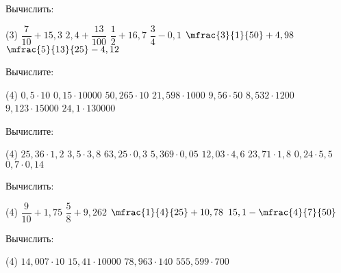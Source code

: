 %
%

\begin{class}[number=1]
	\begin{listofex}
		\item Вычислить:
		\begin{tasks}(3)
			\task \( \dfrac{7}{10}+15,3 \)
			\task \( 2,4+\dfrac{13}{100} \)
			\task \( \dfrac{1}{2}+16,7 \)
			\task \( \dfrac{3}{4}-0,1 \)
			\task \( \mfrac{3}{1}{50}+4,98 \)
			\task \( \mfrac{5}{13}{25}-4,12 \)
		\end{tasks}
		\item Вычислите:
		\begin{tasks}(4)
			\task \( 0,5\cdot10 \)
			\task \( 0,15\cdot10000 \)
			\task \( 50,265\cdot10 \)
			\task \( 21,598\cdot1000 \)
			\task \( 9,56\cdot50 \)
			\task \( 8,532\cdot1200 \)
			\task \( 9,123\cdot15000 \)
			\task \( 24,1\cdot130000 \)
		\end{tasks}
		\item Вычислите:
		\begin{tasks}(4)
			\task \( 25,36\cdot1,2 \)
			\task \( 3,5\cdot3,8 \)
			\task \( 63,25\cdot0,3 \)
			\task \( 5,369\cdot0,05 \)
			\task \( 12,03\cdot4,6 \)
			\task \( 23,71\cdot1,8 \)
			\task \( 0,24\cdot5,5 \)
			\task \( 0,7\cdot0,14 \)
		\end{tasks}
	\end{listofex}
\end{class}

\begin{homework}[number=1]
	\begin{listofex}
		\item Вычислить:
		\begin{tasks}(4)
			\task \( \dfrac{9}{10}+1,75 \)
			\task \( \dfrac{5}{8}+9,262 \)
			\task \( \mfrac{1}{4}{25}+10,78 \)
			\task \( 15,1-\mfrac{4}{7}{50} \)
		\end{tasks}
		\item Вычислить:
		\begin{tasks}(4)
			\task \( 14,007\cdot10 \)
			\task \( 15,41\cdot10000 \)
			\task \( 78,963\cdot140 \)
			\task \( 555,599\cdot700 \)
		\end{tasks}
	\end{listofex}
\end{homework}

